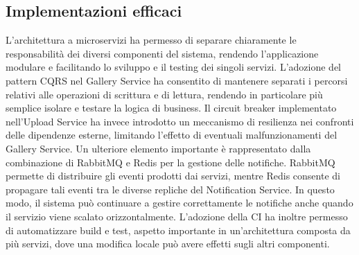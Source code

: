 \documentclass[conference]{IEEEtran}
\begin{document}
\subsection{Implementazioni efficaci}
L'architettura a microservizi ha permesso di separare chiaramente le responsabilità dei diversi componenti del sistema, rendendo l'applicazione modulare e facilitando lo sviluppo e il testing dei singoli servizi. L'adozione del pattern CQRS nel Gallery Service ha consentito di mantenere separati i percorsi relativi alle operazioni di scrittura e di lettura, rendendo in particolare più semplice isolare e testare la logica di business. Il circuit breaker implementato nell'Upload Service ha invece introdotto un meccanismo di resilienza nei confronti delle dipendenze esterne, limitando l'effetto di eventuali malfunzionamenti del Gallery Service. Un ulteriore elemento importante è rappresentato dalla combinazione di RabbitMQ e Redis per la gestione delle notifiche. RabbitMQ permette di distribuire gli eventi prodotti dai servizi, mentre Redis consente di propagare tali eventi tra le diverse repliche del Notification Service. In questo modo, il sistema può continuare a gestire correttamente le notifiche anche quando il servizio viene scalato orizzontalmente. L'adozione della CI ha inoltre permesso di automatizzare build e test, aspetto importante in un'architettura composta da più servizi, dove una modifica locale può avere effetti sugli altri componenti.
\end{document}

